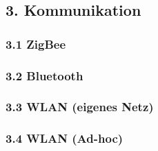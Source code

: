 \subsection{3. Kommunikation}

\subsubsection{3.1 ZigBee}

\subsubsection{3.2 Bluetooth}

\subsubsection{3.3 WLAN (eigenes Netz)}

\subsubsection{3.4 WLAN (Ad-hoc)}